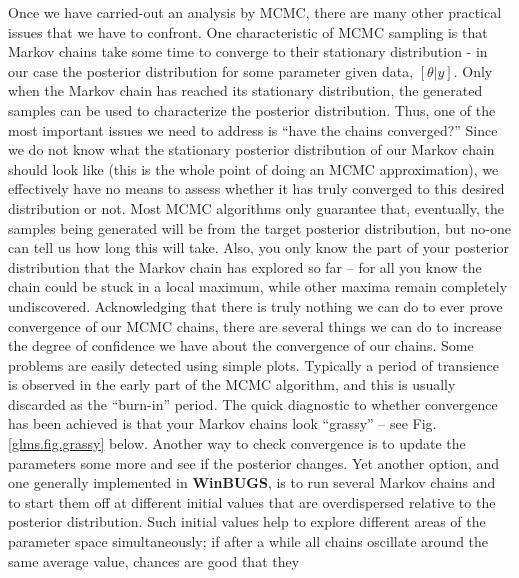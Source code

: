 Once we have carried-out an analysis by MCMC, there are many other
practical issues that we have to confront. One characteristic of MCMC sampling is that Markov chains take some time to converge to their stationary distribution - in our case the posterior distribution for some parameter given  data, $[\theta|y]$. Only when the Markov chain has reached
its stationary distribution, the generated samples can be used to
characterize the posterior distribution. Thus, one of the most important issues we need to address 
is ``have the chains converged?'' Since we do not know what the
stationary posterior distribution of our Markov chain should look like
(this is the whole point of doing an MCMC approximation), we
effectively have no means to assess whether it has truly converged to
this desired distribution or not. Most MCMC algorithms only guarantee
that, eventually, the samples being generated will be from the target
posterior distribution, but no-one can tell us how long this will
take. Also, you only know the part of your posterior distribution that
the Markov chain has explored so far -- for all you know the chain
could be stuck in a local maximum, while other maxima remain
completely undiscovered.  Acknowledging that there is truly nothing we
can do to ever prove convergence of our MCMC chains, there are several
things we can do to increase the degree of confidence we have about
the convergence of our chains. Some problems are easily detected using
simple plots.  Typically a period of transience is observed in the
early part of the MCMC algorithm, and this is usually discarded as the
``burn-in'' period. The quick diagnostic to whether convergence has
been achieved is that your Markov chains look ``grassy'' -- see Fig.
\ref{glms.fig.grassy} below.  Another way to check convergence is to
update the parameters some more and see if the posterior changes. Yet
another option, and one generally implemented in {\bf WinBUGS}, is to
run several Markov chains and to start them off at different initial
values that are overdispersed relative to the posterior
distribution. Such initial values help to explore different areas of
the parameter space simultaneously; if after a while all chains
oscillate around the same average value, chances are good that they
